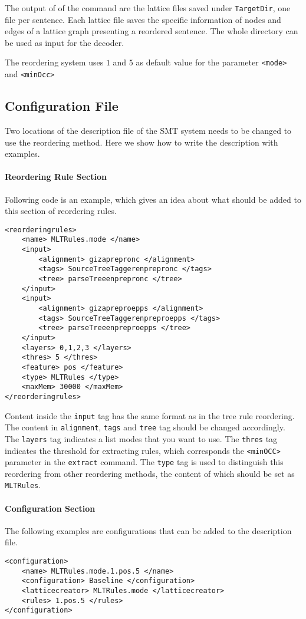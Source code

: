 The output of of the command are the lattice files saved under \verb|TargetDir|, one file per sentence. Each lattice file saves the specific information of nodes and edges of a lattice graph presenting a reordered sentence. The whole directory can be used as input for the decoder.

The reordering system uses $1$ and $5$ as default value for the parameter \verb|<mode>| and  \verb|<minOcc>|\\

\subsection{Configuration File}

Two locations of the description file of the SMT system needs to be changed to use the reordering method. Here we show how to write the description with examples.

\paragraph{Reordering Rule Section}
Following code is an example, which gives an idea about what should be added to this section of reordering rules.

\begin{Verbatim}[frame=single]
<reorderingrules>
    <name> MLTRules.mode </name>
    <input>
        <alignment> gizaprepronc </alignment>
        <tags> SourceTreeTaggerenprepronc </tags>
        <tree> parseTreeenprepronc </tree>
    </input>
    <input>
        <alignment> gizapreproepps </alignment>
        <tags> SourceTreeTaggerenpreproepps </tags>
        <tree> parseTreeenpreproepps </tree>
    </input>
    <layers> 0,1,2,3 </layers>
    <thres> 5 </thres>
    <feature> pos </feature>
    <type> MLTRules </type>
    <maxMem> 30000 </maxMem>
</reorderingrules>
\end{Verbatim}
Content inside the \verb|input| tag has the same format as in the tree rule reordering. The content in \verb|alignment|, \verb|tags| and \verb|tree| tag should be changed accordingly. The \verb|layers| tag indicates a list modes that you want to use. The \verb|thres| tag indicates the threshold for extracting rules, which corresponds the \verb|<minOCC>| parameter in the \verb|extract| command. The \verb|type| tag is used to distinguish this reordering from other reordering methods, the content of which should be set as \verb|MLTRules|.

\paragraph{Configuration Section}
The following examples are configurations that can be added to the description file.
\begin{Verbatim}[frame=single]
<configuration>
    <name> MLTRules.mode.1.pos.5 </name>
    <configuration> Baseline </configuration>
    <latticecreator> MLTRules.mode </latticecreator>
    <rules> 1.pos.5 </rules>
</configuration>
\end{Verbatim}

